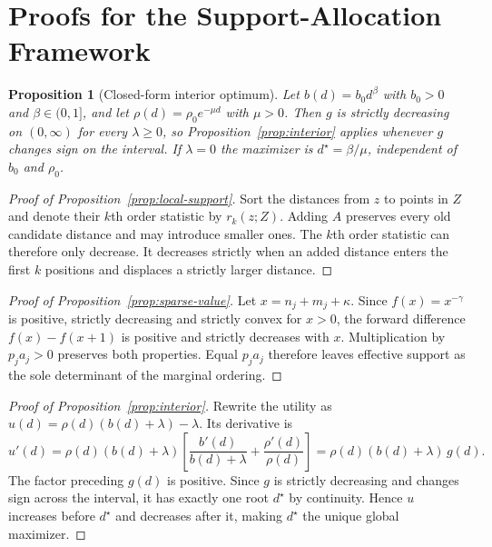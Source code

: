 \documentclass{article}
\newtheorem{proposition}{Proposition}
\begin{document}
\section{Proofs for the Support-Allocation Framework}
\label{app:proofs}

\begin{proposition}[Closed-form interior optimum]
\label{prop:closed-form}
Let $b(d)=b_0d^{\beta}$ with $b_0>0$ and $\beta\in(0,1]$, and let $\rho(d)=\rho_0e^{-\mu d}$ with $\mu>0$. Then $g$ is strictly decreasing on $(0,\infty)$ for every $\lambda\geq0$, so Proposition~\ref{prop:interior} applies whenever $g$ changes sign on the interval. If $\lambda=0$ the maximizer is $d^{\star}=\beta/\mu$, independent of $b_0$ and $\rho_0$.
\end{proposition}

\begin{proof}[Proof of Proposition~\ref{prop:local-support}]
Sort the distances from $z$ to points in $Z$ and denote their $k$th order statistic by $r_k(z;Z)$. Adding $A$ preserves every old candidate distance and may introduce smaller ones. The $k$th order statistic can therefore only decrease. It decreases strictly when an added distance enters the first $k$ positions and displaces a strictly larger distance.
\end{proof}

\begin{proof}[Proof of Proposition~\ref{prop:sparse-value}]
Let $x=n_j+m_j+\kappa$. Since $f(x)=x^{-\gamma}$ is positive, strictly decreasing and strictly convex for $x>0$, the forward difference $f(x)-f(x+1)$ is positive and strictly decreases with $x$. Multiplication by $p_ja_j>0$ preserves both properties. Equal $p_ja_j$ therefore leaves effective support as the sole determinant of the marginal ordering.
\end{proof}

\begin{proof}[Proof of Proposition~\ref{prop:interior}]
Rewrite the utility as $u(d)=\rho(d)(b(d)+\lambda)-\lambda$. Its derivative is
\[
u'(d)=\rho(d)(b(d)+\lambda)\left[\frac{b'(d)}{b(d)+\lambda}+\frac{\rho'(d)}{\rho(d)}\right]=\rho(d)(b(d)+\lambda)\,g(d).
\]
The factor preceding $g(d)$ is positive. Since $g$ is strictly decreasing and changes sign across the interval, it has exactly one root $d^\star$ by continuity. Hence $u$ increases before $d^\star$ and decreases after it, making $d^\star$ the unique global maximizer.
\end{proof}
\end{document}
